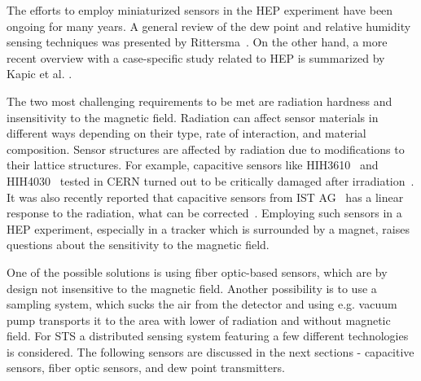 The efforts to employ miniaturized sensors in the \gls{HEP} experiment have been ongoing for many years. A general review of the dew point and relative humidity sensing techniques was presented by Rittersma~\cite{RITTERSMA}. On the other hand, a more recent overview with a case-specific study related to \gls{HEP} is summarized by Kapic et al. \cite{Kapic}.

The two most challenging requirements to be met are radiation hardness and insensitivity to the magnetic field. Radiation can affect sensor materials in different ways depending on their type, rate of interaction, and material composition. Sensor structures are affected by radiation due to modifications to their lattice structures. For example, capacitive sensors like HIH3610~\cite{HIH3610} and HIH4030~\cite{HIH4030} tested in CERN turned out to be critically damaged after irradiation~\cite{Berruti}. It was also recently reported that capacitive sensors from IST AG~\cite{MK33} has a linear response to the radiation, what can be corrected~\cite{Kapic_sensor}. Employing such sensors in a \gls{HEP} experiment, especially in a tracker which is surrounded by a magnet, raises questions about the sensitivity to the magnetic field. 

One of the possible solutions is using fiber optic-based sensors, which are by design not insensitive to the magnetic field. Another possibility is to use a sampling system, which sucks the air from the detector and using e.g. vacuum pump transports it to the area with lower of radiation and without magnetic field.
For \gls{STS} a distributed sensing system featuring a few different technologies is considered. The following sensors are discussed in the next sections -  capacitive sensors, fiber optic sensors, and dew point transmitters. 


